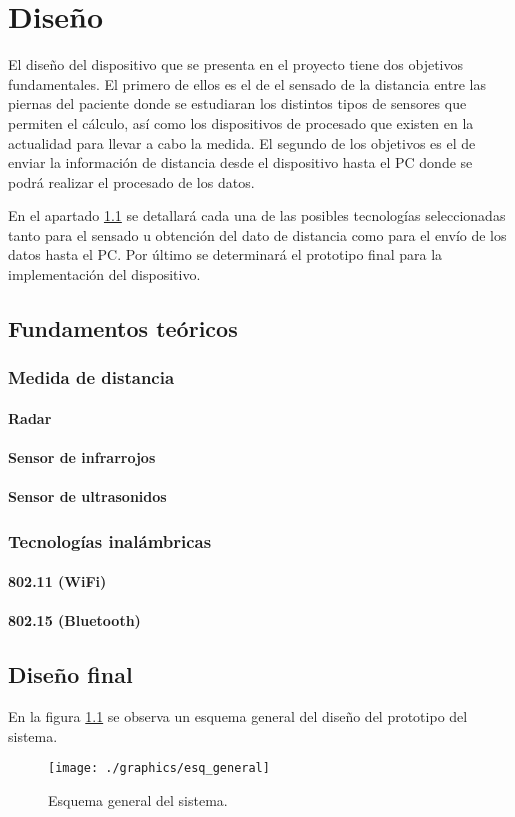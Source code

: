 \chapter{Diseño\label{sec:disenho}}

El diseño del dispositivo que se presenta en el proyecto tiene dos objetivos fundamentales. El primero de ellos es el de el sensado de la distancia entre las piernas del paciente donde se estudiaran los distintos tipos de sensores que permiten el cálculo, así como los dispositivos de procesado que existen en la actualidad para llevar a cabo la medida. El segundo de los objetivos es el de enviar la información de distancia desde el dispositivo hasta el PC donde se podrá realizar el procesado de los datos.

En el apartado \ref*{sec:fund_teóricos} se detallará cada una de las posibles tecnologías seleccionadas tanto para el sensado u obtención del dato de distancia como para el envío de los datos hasta el PC. Por último se determinará el prototipo final para la implementación del dispositivo. 

\section{Fundamentos teóricos}\label{sec:fund_teóricos}

 \subsection{Medida de distancia}
  \subsubsection{Radar}
  \subsubsection{Sensor de infrarrojos}
  \subsubsection{Sensor de ultrasonidos}
  
 \subsection{Tecnologías inalámbricas}
	 \subsubsection{802.11 (WiFi)}
	 \subsubsection{802.15 (Bluetooth)}
\section{Diseño final}

En la figura \ref{fig:esq_general} se observa un esquema general del diseño del prototipo del sistema.
\begin{figure}[htb]
	\centering
	\texttt{[image: ./graphics/esq\_general]}
	\caption{Esquema general del sistema.} \label{fig:esq_general}
\end{figure}
